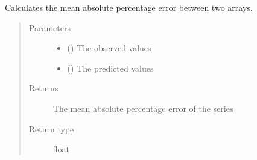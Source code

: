\documentclass[letterpaper,10pt,english]{sphinxmanual}
\begin{document}

\begin{fulllineitems}
\label{\detokenize{eval_inspect:Foresight.eval_inspect.mean_absolute_percentage_error}}
Calculates the mean absolute percentage error between two arrays.
\begin{quote}\begin{description}
\item[{Parameters}] \leavevmode\begin{itemize}
\item {} 
 () \textendash{} The observed values

\item {} 
 () \textendash{} The predicted values

\end{itemize}

\item[{Returns}] \leavevmode
The mean absolute percentage error of the series

\item[{Return type}] \leavevmode
float

\end{description}\end{quote}

\end{fulllineitems}

\end{document}
